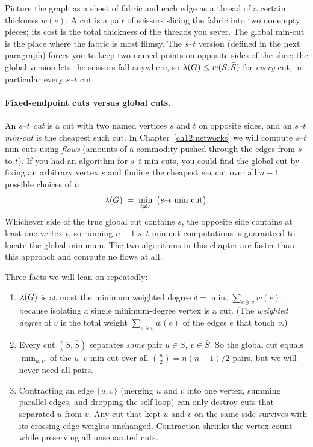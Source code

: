 \begin{intuitionbox}
Picture the graph as a sheet of fabric and each edge as a thread of a certain thickness $w(e)$. A cut is a pair of scissors slicing the fabric into two nonempty pieces; its cost is the total thickness of the threads you sever. The global min-cut is the place where the fabric is most flimsy. The $s$--$t$ version (defined in the next paragraph) forces you to keep two named points on opposite sides of the slice; the global version lets the scissors fall anywhere, so $\lambda(G) \le w(S,\bar S)$ for \emph{every} cut, in particular every $s$--$t$ cut.
\end{intuitionbox}

\paragraph{Fixed-endpoint cuts versus global cuts.}
An \emph{$s$--$t$ cut} is a cut with two named vertices $s$ and $t$ on opposite sides, and an \emph{$s$--$t$ min-cut} is the cheapest such cut. In Chapter~\ref{ch12:networks} we will compute $s$--$t$ min-cuts using \emph{flows} (amounts of a commodity pushed through the edges from $s$ to $t$). If you had an algorithm for $s$--$t$ min-cuts, you could find the global cut by fixing an arbitrary vertex $s$ and finding the cheapest $s$--$t$ cut over all $n-1$ possible choices of $t$:
\[
  \lambda(G) \;=\; \min_{t\neq s}\; \big(\text{$s$--$t$ min-cut}\big).
\]
Whichever side of the true global cut contains $s$, the opposite side contains at least one vertex $t$, so running $n-1$ $s$--$t$ min-cut computations is guaranteed to locate the global minimum. The two algorithms in this chapter are faster than this approach and compute no flows at all.

\begin{focusbox}
Three facts we will lean on repeatedly:
\begin{enumerate}
  \item $\lambda(G)$ is at most the minimum weighted degree $\delta = \min_v \sum_{e\ni v} w(e)$, because isolating a single minimum-degree vertex is a cut. (The \emph{weighted degree} of $v$ is the total weight $\sum_{e\ni v} w(e)$ of the edges $e$ that touch $v$.)
  \item Every cut $(S,\bar S)$ separates \emph{some} pair $u\in S$, $v\in \bar S$. So the global cut equals $\min_{u,v}$ of the $u$--$v$ min-cut over all $\binom{n}{2}=n(n-1)/2$ pairs, but we will never need all pairs.
  \item Contracting an edge $\{u,v\}$ (merging $u$ and $v$ into one vertex, summing parallel edges, and dropping the self-loop) can only destroy cuts that separated $u$ from $v$. Any cut that kept $u$ and $v$ on the same side survives with its crossing edge weights unchanged. Contraction shrinks the vertex count while preserving all unseparated cuts.
\end{enumerate}
\end{focusbox}

